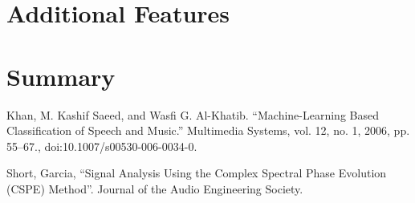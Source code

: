 \documentclass[12pt,letterpaper]{article}
\begin{document}

\section{Additional Features}



\section*{Summary}


\begin{thebibliography}{9}


Khan, M. Kashif Saeed, and Wasfi G. Al-Khatib. “Machine-Learning Based Classification of Speech and Music.” Multimedia Systems, vol. 12, no. 1, 2006, pp. 55–67., doi:10.1007/s00530-006-0034-0.

Short, Garcia, “Signal Analysis Using the Complex Spectral Phase Evolution (CSPE) Method”. Journal of the Audio Engineering Society.


\end{thebibliography}

\end{document}

